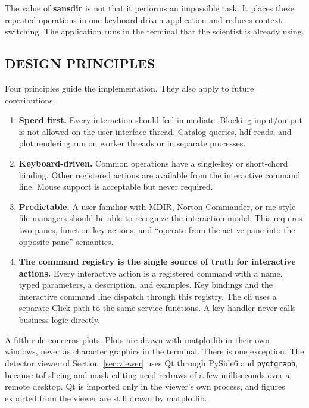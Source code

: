\documentclass[tm]{ornltm}
\begin{document}
The value of \textbf{sansdir} is not that it performs an impossible task. It
places these repeated operations in one keyboard-driven application and reduces
context switching. The application runs in the terminal that the scientist is
already using.

\subsection{DESIGN PRINCIPLES}
\label{sec:principles}

Four principles guide the implementation. They also apply to future
contributions.

\begin{enumerate}
  \item \textbf{Speed first.} Every interaction should feel immediate. Blocking
    input/output is not allowed on the user-interface thread. Catalog queries,
    \ac{hdf} reads, and plot rendering run on worker threads or in separate
    processes.
  \item \textbf{Keyboard-driven.} Common operations have a single-key or
    short-chord binding. Other registered actions are available from the
    interactive command line. Mouse support is acceptable but never required.
  \item \textbf{Predictable.} A user familiar with MDIR, Norton Commander, or
    \ac{mc}-style file managers \autocite{midnightcommander} should be able to
    recognize the interaction model. This requires two panes, function-key
    actions, and ``operate from the active pane into the opposite pane''
    semantics.
  \item \textbf{The command registry is the single source of truth for
    interactive actions.} Every interactive action is a registered command with
    a name, typed parameters, a description, and examples. Key bindings and the
    interactive command line dispatch through this registry. The \ac{cli} uses
    a separate Click path to the same service functions. A key handler never
    calls business logic directly.
\end{enumerate}

A fifth rule concerns plots. Plots are drawn with matplotlib in their own
windows, never as character graphics in the terminal. There is one exception.
The detector viewer of Section~\ref{sec:viewer} uses Qt through PySide6 and
\texttt{pyqtgraph}, because \ac{tof} slicing and mask editing need redraws of a
few milliseconds over a remote desktop. Qt is imported only in the viewer's own
process, and figures exported from the viewer are still drawn by matplotlib.
\end{document}
